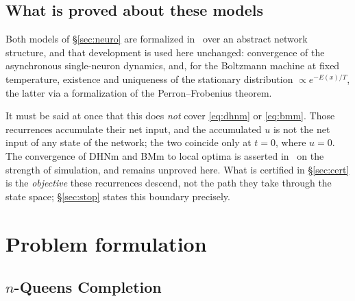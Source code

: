 \documentclass{easychair}
\newcommand{\secref}[1]{\hyperref[#1]{\textcolor{academicpurple}{\S\ref*{#1}}}}
\newcommand{\citeref}[1]{\textcolor{academicpurple}{\cite{#1}}}
\begin{document}
\subsection{What is proved about these models}\label{sec:hnbm}

Both models of \secref{sec:neuro} are formalized in~\citeref{hnbm} over an abstract network
structure, and that development is used here unchanged: convergence of the asynchronous
single-neuron dynamics, and, for the Boltzmann machine at fixed temperature, existence and
uniqueness of the stationary distribution $\propto e^{-E(x)/T}$, the latter via a formalization of
the Perron--Frobenius theorem.

It must be said at once that this does \emph{not} cover \eqref{eq:dhnm} or \eqref{eq:bmm}. Those
recurrences accumulate their net input, and the accumulated $u$ is not the net input of any state of
the network; the two coincide only at $t = 0$, where $u = 0$. The convergence of DHNm and BMm to
local optima is asserted in~\citeref{liwang2022} on the strength of simulation, and remains
unproved here. What is certified in \secref{sec:cert} is the \emph{objective} these recurrences
descend, not the path they take through the state space; \secref{sec:stop} states this boundary
precisely.

\section{Problem formulation}\label{sec:form}

\subsection{$n$-Queens Completion}\label{sec:qc}
\end{document}
